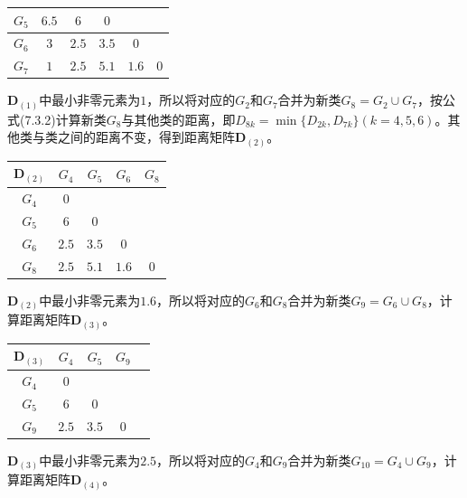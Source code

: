 \begin{enumerate}
\begin{enumerate}[label=(\arabic*)]
\begin{table}[H]
\begin{tabular}{|c|c|c|c|c|c|}
                    $G_5$ & $6.5$ & $6$ & $0$ & & \\ \hline
                    $G_6$ & $3$ & $2.5$ & $3.5$ & $0$ & \\ \hline
                    $G_7$ & $\textit{1}$ & $2.5$ & $5.1$ & $1.6$ & $0$ \\ \hline
                \end{tabular}
            \end{table}
            $\pmb{D}_{(1)}$中最小非零元素为$1$，所以将对应的$G_2$和$G_7$合并为新类$G_8=G_2 \cup G_7$，按公式(7.3.2)计算新类$G_8$与其他类的距离，即$D_{8k} = \min\{D_{2k},D_{7k}\}(k=4,5,6)$。其他类与类之间的距离不变，得到距离矩阵$\pmb{D}_{(2)}$。
            \begin{table}[H]
                \centering
                \begin{tabular}{|c|c|c|c|c|}
                    \hline
                    $\pmb{D}_{(2)}$ & $G_4$ & $G_5$ & $G_6$ & $G_8$ \\ \hline
                    $G_4$ & $0$ & & & \\ \hline
                    $G_5$ & $6$ & $0$ & & \\ \hline
                    $G_6$ & $2.5$ & $3.5$ & $0$ & \\ \hline
                    $G_8$ & $2.5$ & $5.1$ & $\textit{1.6}$ & $0$ \\ \hline
                \end{tabular}
            \end{table}
            $\pmb{D}_{(2)}$中最小非零元素为$1.6$，所以将对应的$G_6$和$G_8$合并为新类$G_9=G_6 \cup G_8$，计算距离矩阵$\pmb{D}_{(3)}$。
            \begin{table}[H]
                \centering
                \begin{tabular}{|c|c|c|c|c|}
                    \hline
                    $\pmb{D}_{(3)}$ & $G_4$ & $G_5$ & $G_9$ \\ \hline
                    $G_4$ & $0$ & & \\ \hline
                    $G_5$ & $6$ & $0$ & \\ \hline
                    $G_9$ & $\textit{2.5}$ & $3.5$ & $0$ \\ \hline
                \end{tabular}
            \end{table}
            $\pmb{D}_{(3)}$中最小非零元素为$2.5$，所以将对应的$G_4$和$G_9$合并为新类$G_{10}=G_4 \cup G_9$，计算距离矩阵$\pmb{D}_{(4)}$。
            \begin{table}[H]

\end{table}
\end{enumerate}
\end{enumerate}
